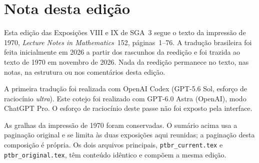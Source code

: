 \clearpage
\chapter*{Nota desta edição}
\thispagestyle{plain}
Esta edição das Exposições VIII e IX de SGA~3 segue o
texto da impressão de 1970, \emph{Lecture Notes in
Mathematics}~152, páginas~1--76. A tradução brasileira
foi feita inicialmente em 2026 a partir dos rascunhos
da reedição e foi trazida ao texto de 1970 em novembro
de 2026. Nada da reedição permanece no texto, nas notas,
na estrutura ou nos comentários desta edição.

A primeira tradução foi realizada com OpenAI Codex
(GPT-5.6 Sol, esforço de raciocínio \emph{ultra}).
Este cotejo foi realizado com GPT-6.0 Astra (OpenAI),
modo ChatGPT Pro. O esforço de raciocínio deste passe
não foi exposto pela interface.

As gralhas da impressão de 1970 foram conservadas.
O sumário acima usa a paginação original e se limita
às duas exposições aqui reunidas; a paginação desta
composição é própria. Os dois arquivos principais,
\texttt{ptbr\_current.tex} e \texttt{ptbr\_original.tex},
têm conteúdo idêntico e compõem a mesma edição.

\mainmatter




